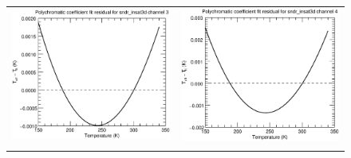 \begin{figure}[H]
\begin{tabular}{c c}
    \includegraphics[scale=0.35]{graphics/sndr/tfit/sndr_insat3d-3.tfit.eps} &
    \includegraphics[scale=0.35]{graphics/sndr/tfit/sndr_insat3d-4.tfit.eps} \\\\

\end{tabular}
\end{figure}

